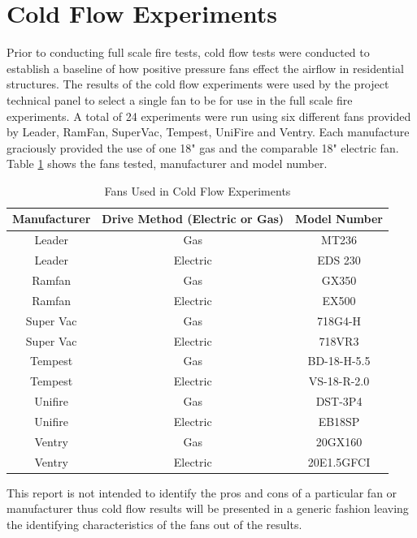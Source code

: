 \documentclass{article}
\begin{document}
\clearpage

\section{Cold Flow Experiments}
Prior to conducting full scale fire tests, cold flow tests were conducted to establish a baseline of how positive pressure fans effect the airflow in residential structures. The results of the cold flow experiments were used by the project technical panel to select a single fan to be for use in the full scale fire experiments. A total of 24 experiments were run using six different fans provided by Leader, RamFan, SuperVac, Tempest, UniFire and Ventry. Each manufacture graciously provided the use of one 18" gas and the comparable 18" electric fan. Table \ref{table:cold_flow_Fans} shows the fans tested, manufacturer and model number. 

\begin{table}[H]
	\centering
	\caption{Fans Used in Cold Flow Experiments}
	\begin{tabular}{|c|c|c|}
		\hline
		Manufacturer & Drive Method (Electric or Gas) & Model Number \\ \hline \hline
		Leader & Gas & MT236 \\ \hline
		Leader & Electric & EDS 230 \\ \hline
		Ramfan & Gas & GX350 \\ \hline
		Ramfan & Electric & EX500 \\ \hline
		Super Vac & Gas & 718G4-H \\ \hline
		Super Vac & Electric & 718VR3 \\ \hline
		Tempest & Gas & BD-18-H-5.5 \\ \hline
		Tempest & Electric & VS-18-R-2.0 \\ \hline
		Unifire & Gas & DST-3P4 \\ \hline
		Unifire & Electric & EB18SP \\ \hline
		Ventry & Gas & 20GX160 \\ \hline
		Ventry & Electric & 20E1.5GFCI \\ \hline
	\end{tabular}
	\label{table:cold_flow_Fans}
\end{table}

This report is not intended to identify the pros and cons of a particular fan or manufacturer thus cold flow results will be presented in a generic fashion leaving the identifying characteristics of the fans out of the results. 
\end{document}
